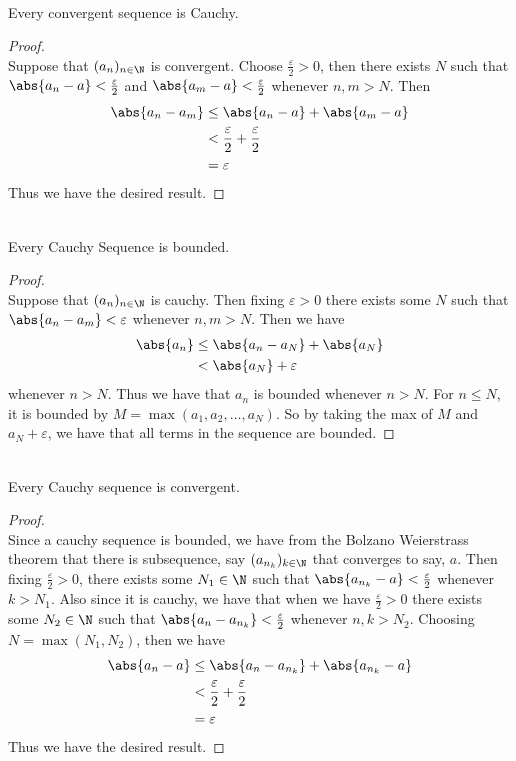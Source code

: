 \documentclass[a4paper]{article}
\begin{document}
\begin{prp}{}{}\\ Every convergent sequence is Cauchy. 
\begin{proof}\\ Suppose that $(a_n)_{n\in\N}$ is convergent. Choose $\frac{\varepsilon}{2}>0$, then there exists $N$ such that $\abs{a_n-a}<\frac{\varepsilon}{2}$ and $\abs{a_m-a}<\frac{\varepsilon}{2}$ whenever $n,m>N$. Then 
\begin{align*}
\abs{a_n-a_m}&\leq\abs{a_n-a}+\abs{a_m-a} \\
&<\frac{\varepsilon}{2}+\frac{\varepsilon}{2} \\
&=\varepsilon
\end{align*}
Thus we have the desired result. 
\end{proof}
\end{prp}

\begin{prp}{}{}\\ Every Cauchy Sequence is bounded. 
\begin{proof}\\ Suppose that $(a_n)_{n\in\N}$ is cauchy. Then fixing $\varepsilon>0$ there exists some $N$ such that $\abs{a_n-a_m}<\varepsilon$ whenever $n,m>N$. Then we have
\begin{align*}
\abs{a_n}&\leq\abs{a_n-a_N}+\abs{a_N}\\
&<\abs{a_N}+\varepsilon
\end{align*}
whenever $n>N$. Thus we have that $a_n$ is bounded whenever $n>N$. For $n\leq N$, it is bounded by $M=\max{(a_1,a_2,\dots,a_N)}$. So by taking the max of $M$ and $a_N+\varepsilon$, we have that all terms in the sequence are bounded. 
\end{proof}
\end{prp}

\begin{prp}{}{}\\ Every Cauchy sequence is convergent. 
\begin{proof}\\ Since a cauchy sequence is bounded, we have from the Bolzano Weierstrass theorem that there is subsequence, say $(a_{n_k})_{k\in\N}$ that converges to say, $a$. Then fixing $\frac{\varepsilon}{2}>0$, there exists some $N_1\in\N$ such that $\abs{a_{n_k}-a}<\frac{\varepsilon}{2}$ whenever $k>N_1$. Also since it is cauchy, we have that when we have $\frac{\varepsilon}{2}>0$ there exists some $N_2\in\N$ such that $\abs{a_n-a_{n_k}}<\frac{\varepsilon}{2}$ whenever $n,k>N_2$. Choosing $N=\max{(N_1,N_2)}$, then we have 
\begin{align*}
\abs{a_n-a}&\leq\abs{a_n-a_{n_k}}+\abs{a_{n_k}-a} \\
&<\frac{\varepsilon}{2}+\frac{\varepsilon}{2} \\
&=\varepsilon
\end{align*}
Thus we have the desired result. 
\end{proof}
\end{prp}
\end{document}
